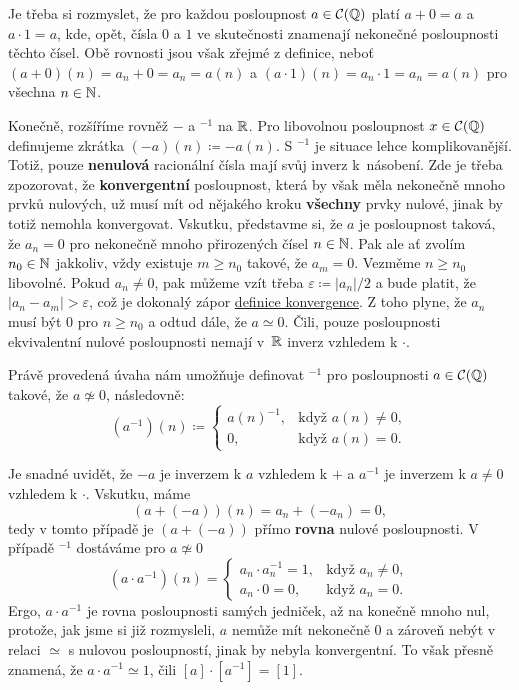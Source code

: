 Je třeba si rozmyslet, že pro každou posloupnost $a \in \mathcal{C}(\mathbb{Q})$ platí
$a + 0 = a$ a $a \cdot 1 = a$, kde, opět, čísla $0$ a $1$ ve skutečnosti
znamenají nekonečné posloupnosti těchto čísel. Obě rovnosti jsou však zřejmé z
definice, neboť $(a+0)(n) = a_n + 0 = a_n = a(n)$ a $(a \cdot 1)(n) = a_n \cdot
1 = a_n = a(n)$ pro všechna $n \in \mathbb{N}$.

Konečně, rozšíříme rovněž $-$ a $^{-1}$ na $\mathbb{R}$. Pro libovolnou posloupnost $x
\in \mathcal{C}(\mathbb{Q})$ definujeme zkrátka $(-a)(n) \coloneqq -a(n)$. S $^{-1}$ je
situace lehce komplikovanější. Totiž, pouze \textbf{nenulová} racionální čísla
mají svůj inverz k~násobení. Zde je třeba zpozorovat, že \textbf{konvergentní}
posloupnost, která by však měla nekonečně mnoho prvků nulových, už musí mít od
nějakého kroku \textbf{všechny} prvky nulové, jinak by totiž nemohla
konvergovat. Vskutku, představme si, že $a$ je posloupnost taková, že $a_n = 0$
pro nekonečně mnoho přirozených čísel $n \in \mathbb{N}$. Pak ale ať zvolím $n_0 \in \mathbb{N}$
jakkoliv, vždy existuje $m \geq n_0$ takové, že $a_m = 0$. Vezměme $n \geq n_0$
libovolné. Pokud $a_n \neq 0$, pak můžeme vzít třeba $\varepsilon \coloneqq
|a_n| / 2$ a bude platit, že $|a_n - a_m| > \varepsilon$, což je dokonalý zápor
\hyperref[def:konvergentni-posloupnost]{definice konvergence}. Z toho plyne, že
$a_n$ musí být $0$ pro $n \geq n_0$ a odtud dále, že $a \simeq 0$. Čili, pouze
posloupnosti ekvivalentní nulové posloupnosti nemají v~$\mathbb{R}$ inverz vzhledem k $
\cdot $.

Právě provedená úvaha nám umožňuje definovat $^{-1}$ pro posloupnosti $a \in
\mathcal{C}(\mathbb{Q})$ takové, že $a \not\simeq 0$, následovně:
\[
 (a^{-1})(n) \coloneqq \begin{cases}
  a(n)^{-1},& \text{když } a(n) \neq 0,\\
  0, &\text{když } a(n) = 0.
 \end{cases}
\]
 
Je snadné uvidět, že $-a$ je inverzem k $a$ vzhledem k $+$ a $a^{-1}$ je
inverzem k $a \neq 0$ vzhledem k $ \cdot $. Vskutku, máme
\[
 (a + (-a))(n) = a_n + (-a_n) = 0,
\]
tedy v tomto případě je $(a + (-a))$ přímo \textbf{rovna} nulové posloupnosti. V
případě $^{-1}$ dostáváme pro $a \not\simeq 0$
\[
 (a \cdot a^{-1})(n) = \begin{cases}
  a_n \cdot a_n^{-1} = 1,& \text{když } a_n \neq 0,\\
  a_n \cdot 0 = 0,& \text{když } a_n = 0.
 \end{cases}
\]
Ergo, $a \cdot a^{-1}$ je rovna posloupnosti samých jedniček, až na konečně
mnoho nul, protože, jak jsme si již rozmysleli, $a$ nemůže mít nekonečně $0$ a
zároveň nebýt v relaci $ \simeq $ s nulovou posloupností, jinak by nebyla
konvergentní. To však přesně znamená, že $a \cdot a^{-1} \simeq 1$, čili $[a]
\cdot [a^{-1}] = [1]$.

